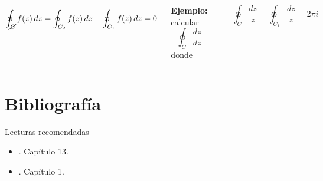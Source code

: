 \documentclass[9pt, aspectratio=169]{beamer}
\begin{document}
\begin{frame}
\begin{columns}[t]
 \cx
 \[\oint_{\cancel{C}} f(z) \, dz = \oint_{C_2} f(z) \, dz - \oint_{C_1} f(z) \, dz = 0 \]

 \textbf{Ejemplo:} calcular
 \[ \oint_C \frac{dz}{dz} \]
 donde
  \begin{center}
      \includegraphics[scale=0.40]{figs/fig-05.pdf}
  \end{center}

  \[ \oint_C \frac{dz}{z} = \oint_{C_1} \frac{dz}{z} = 2 \pi i \]

\end{columns}


\end{frame}


\section*{Bibliografía}
\begin{frame}[allowframebreaks]{Lecturas recomendadas}
\begin{itemize}
 \item {}. Capítulo 13.
 \item {}. Capítulo 1.
\end{itemize}

\end{frame}
\end{document}
